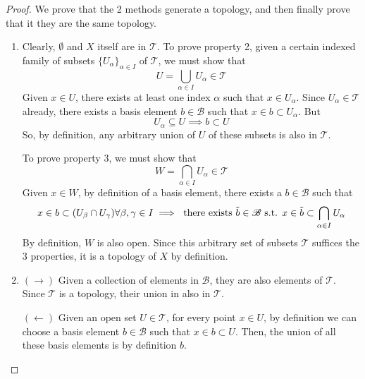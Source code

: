     \begin{proof}
      We prove that the 2 methods generate a topology, and then finally prove that it they are the same topology. 
      \begin{enumerate}
        \item Clearly, $\emptyset$ and $X$ itself are in $\mathscr{T}$. To prove property 2, given a certain indexed family of subsets $\{U_\alpha\}_{\alpha \in I}$ of $\mathscr{T}$, we must show that 
        \begin{equation}
          U = \bigcup_{\alpha \in I} U_\alpha \in \mathscr{T}
        \end{equation}
        Given $x \in U$, there exists at least one index $\alpha$ such that $x \in U_\alpha$. Since $U_\alpha \in \mathscr{T}$ already, there exists a basis element $b \in \mathscr{B}$ such that $x \in b \subset U_\alpha$. But 
        \begin{equation}
          U_\alpha \subseteq U \implies b \subset U
        \end{equation}
        So, by definition, any arbitrary union of $U$ of these subsets is also in $\mathscr{T}$. 

        To prove property 3, we must show that 
        \begin{equation}
          W = \bigcap_{\alpha \in I} U_\alpha \in \mathscr{T}
        \end{equation}
        Given $x \in W$, by definition of a basis element, there exists a $b \in \mathscr{B}$ such that 
        \begin{equation}
          x \in b \subset (U_\beta \cap U_\gamma) \forall \beta, \gamma \in I \implies \text{ there exists } \Tilde{b} \in \mathscr{B} \text{ s.t. } x \in \Tilde{b} \subset \bigcap_{\alpha \in I} U_\alpha
        \end{equation}
        By definition, $W$ is also open. Since this arbitrary set of subsets $\mathscr{T}$ suffices the 3 properties, it is a topology of $X$ by definition. 

        \item $(\rightarrow)$ Given a collection of elements in $\mathscr{B}$, they are also elements of $\mathscr{T}$. Since $\mathscr{T}$ is a topology, their union in also in $\mathscr{T}$. 

        $(\leftarrow)$ Given an open set $U \in \mathscr{T}$, for every point $x \in U$, by definition we can choose a basis element $b \in \mathscr{B}$ such that $x \in b \subset U$. Then, the union of all these basis elements is by definition $b$. 
          
      \end{enumerate}
    \end{proof}


